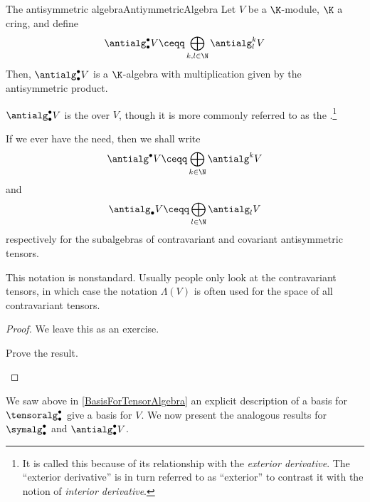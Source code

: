 \begin{thm}{The antisymmetric algebra}{AntiymmetricAlgebra}
	Let $V$ be a $\K$-module, $\K$ a cring, and define
	\begin{equation}
		\antialg _{\bullet}^{\bullet}V\ceqq \bigoplus _{k,l\in \N}\antialg _l^kV
	\end{equation} 
	Then, $\antialg _{\bullet}^{\bullet}V$ is a $\K$-algebra with multiplication given by the antisymmetric product.
	\begin{rmk}
		$\antialg _{\bullet}^{\bullet}V$ is the  over $V$, though it is more commonly referred to as the .\footnote{It is called this because of its relationship with the \emph{exterior derivative}.  The ``exterior derivative'' is in turn referred to as ``exterior'' to contrast it with the notion of \emph{interior derivative}.}
	\end{rmk}
	\begin{rmk}
		If we ever have the need, then we shall write
		\begin{equation}
			\antialg ^{\bullet}V\ceqq \bigoplus _{k\in \N}\antialg ^kV
		\end{equation}\index[notation]{$\antialg ^{\bullet}V$}
		and
		\begin{equation}
		\antialg _{\bullet}V\ceqq \bigoplus _{l\in \N}\antialg _lV
		\end{equation}\index[notation]{$\antialg _{\bullet}V$}
		respectively for the subalgebras of contravariant and covariant antisymmetric tensors.
	\end{rmk}
	\begin{rmk}
		This notation is nonstandard.  Usually people only look at the contravariant tensors, in which case the notation $\Lambda (V)$ is often used for the space of all contravariant tensors.
	\end{rmk}
	\begin{proof}
		We leave this as an exercise.
		\begin{exr}[breakable=false]{}{}
			Prove the result.
		\end{exr}
	\end{proof}
\end{thm}
We saw above in \cref{BasisForTensorAlgebra} an explicit description of a basis for $\tensoralg _{\bullet}^{\bullet}$ give a basis for $V$.  We now present the analogous results for $\symalg _{\bullet}^{\bullet}$ and $\antialg _{\bullet}^{\bullet}V$.
